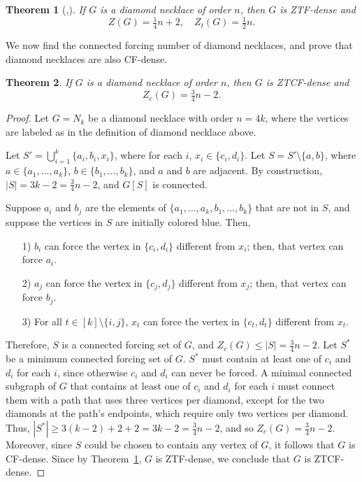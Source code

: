 \documentclass[11pt]{article}
\newtheorem{thm}{Theorem}
\theoremstyle{definition}
\newcommand{\1}{\vspace{0.1cm}}
\newcommand{\2}{\vspace{0.2cm}}
\newcommand{\3}{\vspace{0.3cm}}
\begin{document}
\begin{thm}[\cite{DaHe18b},\cite{DaHePe2023a}]\label{t:necklace1}
If $ G $ is a diamond necklace of order $ n $, then $ G $ is ZTF-dense and
\[
Z(G) = \tfrac{1}{4}n + 2, \quad Z_t(G) = \tfrac{1}{2}n.
\]
\end{thm}

We now find the connected forcing number of diamond necklaces, and prove that diamond necklaces are also CF-dense.

\begin{thm}\label{thm:diamond-necklace}
If $ G $ is a diamond necklace of order $ n $, then $ G $ is ZTCF-dense and
\[
Z_c(G) = \tfrac{3}{4}n - 2.
\]
\end{thm}

\begin{proof}
Let $ G = N_k $ be a diamond necklace with order $ n = 4k $, where the vertices are labeled as in the definition of diamond necklace above. 

Let $S' = \bigcup_{i=1}^k \{a_i, b_i, x_i\}$, where for each $i$, $x_i\in\{c_i,d_i\}$. Let $S=S'\setminus\{a,b\}$, where $a\in \{a_1,\ldots,a_k\}$, $b\in \{b_1,\ldots,b_k\}$, and $a$ and $b$ are adjacent. By construction, $ |S| = 3k - 2 = \tfrac{3}{4}n - 2 $, and $ G[S] $ is connected. 

Suppose $a_i$ and $b_j$ are the elements of $\{a_1,\ldots,a_k,b_1,\ldots,b_k\}$ that are not in $S$, and suppose the vertices in $S$ are initially colored blue. Then,
\begin{enumerate}
    
\item[1)] $b_i$ can force the vertex in $\{c_i,d_i\}$ different from $x_i$; then, that vertex can force $a_i$.
\item[2)] $a_j$ can force the vertex in $\{c_j,d_j\}$ different from $x_j$; then, that vertex can force $b_j$.
\item[3)] For all $t\in [k]\setminus\{i,j\}$, $x_t$ can force the vertex in $\{c_t,d_t\}$ different from $x_t$.
\end{enumerate}
Therefore, $S$ is a connected forcing set of $G$, and $Z_c(G) \le |S| = \tfrac{3}{4}n - 2$. Let $S^*$ be a minimum connected forcing set of $G$. $S^*$ must contain at least one of $c_i$ and $d_i$ for each $i$, since otherwise $c_i$ and $ d_i $ can never be forced. A minimal connected subgraph of $G$ that contains at least one of $c_i$ and $d_i$ for each $i$ must connect them with a path that uses three  vertices per diamond, except for the two diamonds at the path's endpoints, which require only two vertices per diamond. Thus, $|S^*|\geq 3(k-2)+2+2=3k-2=\tfrac{3}{4}n - 2$, and so  $Z_c(G) = \tfrac{3}{4}n - 2 $. Moreover, since $S$ could be chosen to contain any vertex of $G$, it follows that $ G $ is CF-dense. Since by Theorem~\ref{t:necklace1}, $ G $ is ZTF-dense, we conclude that $ G $ is ZTCF-dense.
\end{proof}
\end{document}
